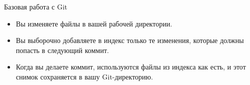\begin{frame}{Базовая работа с Git}
    \begin{itemize}
        \item
        Вы изменяете файлы в вашей рабочей директории.
        \item
        Вы выборочно добавляете в индекс только те изменения, которые должны попасть в следующий коммит.
        \item
        Когда вы делаете коммит, используются файлы из индекса как есть, и этот снимок сохраняется в вашу Git-директорию.
    \end{itemize}
\end{frame}